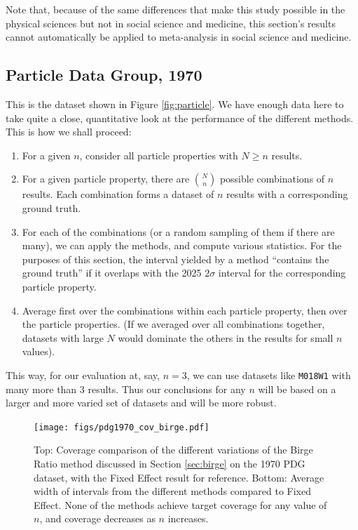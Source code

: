 \documentclass[letterpaper,12pt]{article}
\begin{document}
Note that, because of the same differences that make this study possible in the physical sciences but not in social science and medicine, this section's results cannot automatically be applied to meta-analysis in social science and medicine.

\subsection{Particle Data Group, 1970}

This is the dataset shown in Figure \ref{fig:particle}. We have enough data here to take quite a close, quantitative look at the performance of the different methods. This is how we shall proceed:
\begin{enumerate}
  \item For a given $n$, consider all particle properties with $N\geq n$ results.
  \item For a given particle property, there are $\binom{N}{n}$ possible combinations of $n$ results. Each combination forms a dataset of $n$ results with a corresponding ground truth.
  \item For each of the combinations (or a random sampling of them if there are many), we can apply the methods, and compute various statistics. For the purposes of this section, the interval yielded by a method ``contains the ground truth'' if it overlaps with the 2025 $2\sigma$ interval for the corresponding particle property.
  \item Average first over the combinations within each particle property, then over the particle properties. (If we averaged over all combinations together, datasets with large $N$ would dominate the others in the results for small $n$ values).
\end{enumerate}
This way, for our evaluation at, say, $n=3$, we can use datasets like \texttt{M018W1} with many more than 3 results. Thus our conclusions for any $n$ will be based on a larger and more varied set of datasets and will be more robust.

\begin{figure}[htbp]
  \texttt{[image: figs/pdg1970\_cov\_birge.pdf]}
\caption{
Top: Coverage comparison of the different variations of the Birge Ratio method discussed in Section \ref{sec:birge} on the 1970 PDG dataset, with the Fixed Effect result for reference. Bottom: Average width of intervals from the different methods compared to Fixed Effect. None of the methods achieve target coverage for any value of $n$, and coverage decreases as $n$ increases.
}\label{fig:pdg1970-cov-birge}
\end{figure}
\end{document}

